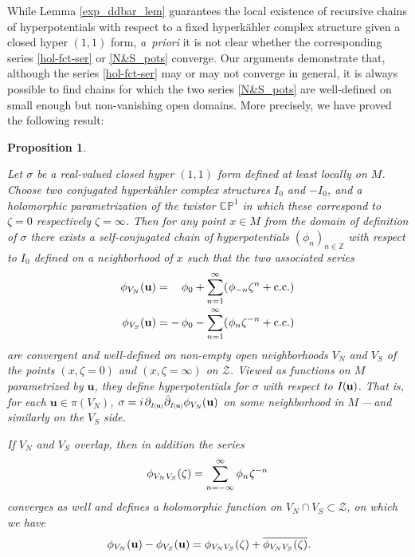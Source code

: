 \documentclass[11pt]{amsart}
\newtheorem{proposition}[theorem]{Proposition}
\theoremstyle{remark}
\theoremstyle{remark}
\theoremstyle{definition}
\theoremstyle{definition}
\theoremstyle{definition}
\newcommand{\IU}{I\nhp(\nhp\mathbf{u}\hspace{-0.2pt})} %
\newcommand{\Iu}{\scriptscriptstyle{I\nhp(\nhp\mathbf{u}\hspace{-0.25pt})}} %
\newcommand{\0}{{\scriptstyle 0'}} %
\newcommand{\1}{{\scriptstyle 1'}}
\newcommand{\pt}{\hspace{1pt}} %
\newcommand{\hp}{\hspace{0.5pt}} %
\newcommand{\nhp}{\hspace{-0.5pt}} %
\begin{document}
While Lemma \ref{exp_ddbar_lem} guarantees the local existence of recursive chains of hyperpotentials with respect to a fixed hyperk\"ahler complex structure given a closed hyper $(1,1)$ form, \mbox{\textit{a priori}} it is not clear whether the corresponding series \eqref{hol-fct-ser} or \eqref{N&S_pots} converge. Our arguments demonstrate that, although the series \eqref{hol-fct-ser} may or may not converge in general, it is always possible to find chains for which the two series \eqref{N&S_pots} are well-defined on small enough but non-vanishing open domains. More precisely, we have proved the following result: 


\begin{proposition} \label{lulu} 

Let $\sigma$ be a real-valued closed hyper $(1,1)$ form defined at least locally on $M$. Choose two conjugated hyperk\"ahler complex structures $I_0$ and $-I_0$, and a holomorphic parametrization of the twistor $\mathbb{CP}^1$ in which these correspond to $\zeta = 0$ respectively $\zeta = \infty$. Then for any point $x \in M$ from the domain of definition of $\sigma$ there exists a self-conjugated chain of hyperpotentials $(\phi_n)_{n \in \mathbb{Z}}$ with respect to $I_0$ defined on a neighborhood of $x$ such that the two associated series
{\allowdisplaybreaks
\begin{equation} \label{phi_VNetco}
\begin{aligned}
\phi_{V_N}(\mathbf{u}) & = \phantom{+\,} \phi_0 + \sum_{n=1}^{\infty} (\hp \phi_{-n} \zeta^n + \text{c.c.} ) \\[-1.5pt]
\phi_{V_S}(\mathbf{u}) & = -\, \phi_0 - \sum_{n=1}^{\infty} (\hp \phi_{n} \zeta^{-n} + \text{c.c.} ) 
\end{aligned}
\end{equation}
}%
are convergent and well-defined on non-empty open neighborhoods $V_N$ and $V_S$ of the points \mbox{$(x,\zeta=0)$} and \mbox{$(x, \zeta=\infty)$} on $\mathcal{Z}$. Viewed as functions on $M$ parametrized by $\mathbf{u}$,  they define hyperpotentials for $\sigma$ with respect to $\IU$. That is, for each $\mathbf{u} \in \pi(V_N)$, \mbox{$\sigma = i \pt \partial_{\Iu}\bar{\partial}_{\Iu} \phi_{V_N}\!\pt(\mathbf{u})$} on some neighborhood in $M$\,---\,and similarly on the $V_S$ side. 

If $V_N$ and $V_S$ overlap, then in addition the series 
\begin{equation} 
\phi_{V_NV_S}(\zeta) = \sum_{n=-\infty}^{\infty} \phi_{n} \hp \zeta^{-n}
\end{equation}
converges as well and defines a holomorphic function on $V_N \cap V_S \subset \mathcal{Z}$, on which we have 
\begin{equation}
\phi_{V_N}(\mathbf{u}) - \phi_{V_S}(\mathbf{u}) = \phi_{V_NV_S}(\zeta) + \overline{\phi_{V_NV_S}(\zeta)} \rlap{.}
\end{equation}
\end{proposition}
\end{document}
